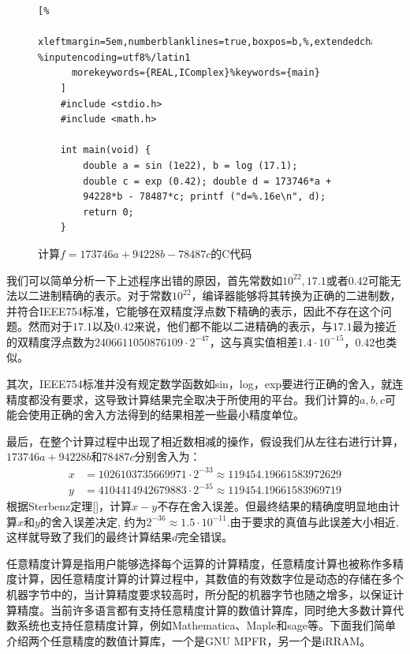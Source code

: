 \begin{figure}[thbp]
    \begin{lstlisting}[%
      xleftmargin=5em,numberblanklines=true,boxpos=b,%,extendedchars=\true, %inputencoding=utf8%/latin1
      morekeywords={REAL,IComplex}%keywords={main}
    ]
    #include <stdio.h>
    #include <math.h>

    int main(void) {
        double a = sin (1e22), b = log (17.1);
        double c = exp (0.42); double d = 173746*a +
        94228*b - 78487*c; printf ("d=%.16e\n", d); 
        return 0;
    }

    \end{lstlisting}
    \caption{计算$f = 173746a + 94228b - 78487c$的C代码}
    \label{lst:arbiexcode}
\end{figure}

我们可以简单分析一下上述程序出错的原因，首先常数如$10^{22},17.1$或者$0.42$可能无法以二进制精确的表示。对于常数$10^{22}$，编译器能够将其转换为正确的二进制数，并符合IEEE754标准，它能够在双精度浮点数下精确的表示，因此不存在这个问题。然而对于$17.1$以及$0.42$来说，他们都不能以二进精确的表示，与$17.1$最为接近的双精度浮点数为$2406611050876109\cdot2^{−47}$，这与真实值相差$1.4\cdot10^{-15}$，$0.42$也类似。

其次，IEEE754标准并没有规定数学函数如sin，log，exp要进行正确的舍入，就连精度都没有要求，这导致计算结果完全取决于所使用的平台。我们计算的$a,b,c$可能会使用正确的舍入方法得到的结果相差一些最小精度单位。

最后，在整个计算过程中出现了相近数相减的操作，假设我们从左往右进行计算，$173746a+94228b$和$78487c$分别舍入为：
\begin{align*}
x & =1026103735669971·2^{-33}≈119454.19661583972629 \\
y & =4104414942679883·2^{-35}≈119454.19661583969719
\end{align*}
根据Sterbenz定理[]，计算$x−y$不存在舍入误差。但最终结果的精确度明显地由计算$x$和$y$的舍入误差决定, 约为$2^{-36}≈1.5·10^{-11} $.由于要求的真值与此误差大小相近, 这样就导致了我们的最终计算结果$d$完全错误。

任意精度计算是指用户能够选择每个运算的计算精度，任意精度计算也被称作多精度计算，因任意精度计算的计算过程中，其数值的有效数字位是动态的存储在多个机器字节中的，当计算精度要求较高时，所分配的机器字节也随之增多，以保证计算精度。当前许多语言都有支持任意精度计算的数值计算库，同时绝大多数计算代数系统也支持任意精度计算，例如Mathematica、Maple和sage等。下面我们简单介绍两个任意精度的数值计算库，一个是GNU MPFR，另一个是iRRAM。

